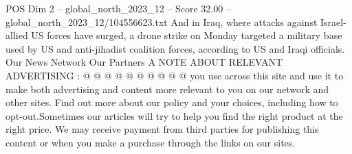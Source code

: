 \begin{textsample}{POS Dim 2 – global\_north\_2023\_12 – Score 32.00 – global\_north\_2023\_12/104556623.txt}
And in Iraq, where attacks against Israel-allied US forces have surged, a drone strike on Monday targeted a military base used by US and anti-jihadist coalition forces, according to US and Iraqi officials.
Our News Network Our Partners A NOTE ABOUT RELEVANT ADVERTISING : @ @ @ @ @ @ @ @ @ @ you use across this site and use it to make both advertising and content more relevant to you on our network and other sites.
Find out more about our policy and your choices, including how to opt-out.Sometimes our articles will try to help you find the right product at the right price.
We may receive payment from third parties for publishing this content or when you make a purchase through the links on our sites.

\end{textsample}
